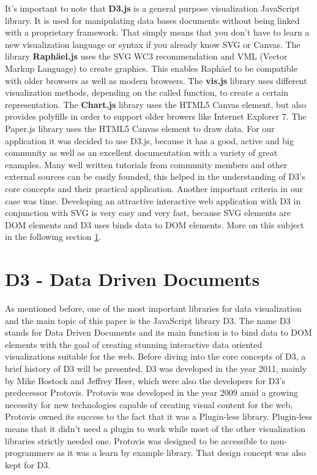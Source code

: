 \documentclass{bioinfo}
\begin{document}
It's important to note that \textbf{D3.js} is a general purpose visualization JavaScript library. It is used for manipulating data bases documents without being linked with a proprietary framework.
That simply means that you don't have to learn a new visualization language or syntax if you already know SVG or Canvas.
\newline
The library \textbf{Raph\"ael.js} uses the SVG WC3 recommendation and VML (Vector Markup Language) to create graphics. This enables Raph\"ael to be compatible with older browsers as well as modern browsers.
\newline
The \textbf{vis.js} library uses different visualization methods, depending on the called function, to create a certain representation.
\newline
The \textbf{Chart.js} library uses the HTML5 Canvas element, but also provides polyfills in order to support older browers like Internet Explorer 7.
\newline
The Paper.js library uses the HTML5 Canvas element to draw data.
\newline
For our application it was decided to use D3.js, because it has a good, active and big community as well as an excellent documentation with a variety of great examples.
Many well written tutorials from community members and other external sources can be easily founded, this helped in the understanding of D3's core concepts and their practical application.
Another important criteria in our case was time. Developing an attractive interactive web application with D3 in conjunction with SVG is very easy and very fast, because SVG elements are DOM elements and D3 uses binds data to DOM elements. More on this subject in the following section \ref{s:d3}.



\section{D3 - Data Driven Documents} \label{s:d3}
As mentioned before, one of the most important libraries for data visualization and the main topic of this paper is the JavaScript library D3. The name D3 stands for Data Driven Documents and its main function is to bind data to DOM elements with the goal of creating stunning interactive data oriented visualizations suitable for the web.
\newline
Before diving into the core concepts of D3, a brief history of D3 will be presented.
D3 was developed in the year 2011, mainly by Mike Bostock and Jeffrey Heer, which were also the developers for D3’s predecessor Protovis.
\newline
Protovis was developed in the year 2009 amid a growing necessity for new technologies capable of creating visual content for the web, Protovis owned its success to the fact that it was a Plugin-less library. Plugin-less means that it didn’t need a plugin to work while most of the other visualization libraries strictly needed one. Protovis was designed to be accessible to non-programmers as it was a learn by example library.
That design concept was also kept for D3.
\end{document}
